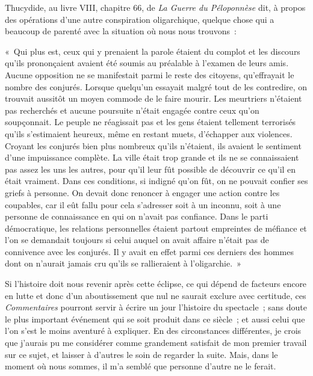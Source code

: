 \documentclass[french,twoside]{book} %
\def\mednobreak{\ifdim\lastskip<\medskipamount
  \removelastskip\nopagebreak\medskip\fi}
\newcommand{\labelblock}[1]{\medbreak{\noindent\color{rubric}\bfseries #1}\par\mednobreak}
\begin{document}
\noindent Thucydide, au livre VIII, chapitre 66, de \emph{La Guerre du Péloponnèse} dit, à propos des opérations d’une autre conspiration oligarchique, quelque chose qui a beaucoup de parenté avec la situation où nous nous trouvons :\par
« Qui plus est, ceux qui y prenaient la parole étaient du complot et les discours qu’ils prononçaient avaient été soumis au préalable à l’examen de leurs amis. Aucune opposition ne se manifestait parmi le reste des citoyens, qu’effrayait le nombre des conjurés. Lorsque quelqu’un essayait malgré tout de les contredire, on trouvait aussitôt un moyen commode de le faire mourir. Les meurtriers n’étaient pas recherchés et aucune poursuite n’était engagée contre ceux qu’on soupçonnait. Le peuple ne réagissait pas et les gens étaient tellement terrorisés qu’ils s’estimaient heureux, même en restant muets, d’échapper aux violences. Croyant les conjurés bien plus nombreux qu’ils n’étaient, ils avaient le sentiment d’une impuissance complète. La ville était trop grande et ils ne se connaissaient pas assez les uns les autres, pour qu’il leur fût possible de découvrir ce qu’il en était vraiment. Dans ces conditions, si indigné qu’on fût, on ne pouvait confier ses griefs à personne. On devait donc renoncer à engager une action contre les coupables, car il eût fallu pour cela s’adresser soit à un inconnu, soit à une personne de connaissance en qui on n’avait pas confiance. Dans le parti démocratique, les relations personnelles étaient partout empreintes de méfiance et l’on se demandait toujours si celui auquel on avait affaire n’était pas de connivence avec les conjurés. Il y avait en effet parmi ces derniers des hommes dont on n’aurait jamais cru qu’ils se rallieraient à l’oligarchie. »\par
Si l’histoire doit nous revenir après cette éclipse, ce qui dépend de facteurs encore en lutte et donc d’un aboutissement que nul ne saurait exclure avec certitude, ces \emph{Commentaires} pourront servir à écrire un jour l’histoire du spectacle ; sans doute le plus important événement qui se soit produit dans ce siècle ; et aussi celui que l’on s’est le moins aventuré à expliquer. En des circonstances différentes, je crois que j’aurais pu me considérer comme grandement satisfait de mon premier travail sur ce sujet, et laisser à d’autres le soin de regarder la suite. Mais, dans le moment où nous sommes, il m’a semblé que personne d’autre ne le ferait.\par

\labelblock{XXVIII}
\end{document}
